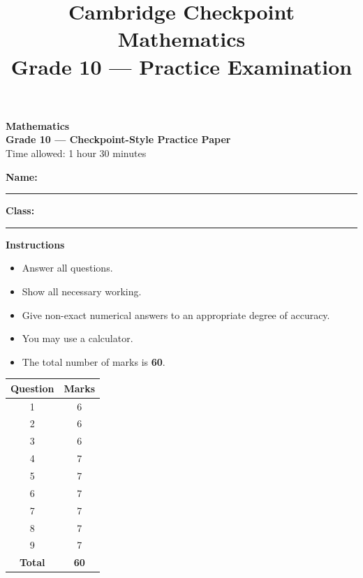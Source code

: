 \makeatletter
{}
\makeatother



\title{Cambridge Checkpoint Mathematics\\
	Grade 10 --- Practice Examination}
\author{}
\date{}


	
	\maketitle
	\vspace{-1.5cm}
	
	\begin{center}
		\textbf{Mathematics}\\[2mm]
		\textbf{Grade 10 --- Checkpoint-Style Practice Paper}\\[2mm]
		Time allowed: 1 hour 30 minutes
	\end{center}
	
	\vspace{5mm}
	
	\noindent
	\textbf{Name:} \rule{8cm}{0.4pt}
	\hfill
	\textbf{Class:} \rule{3cm}{0.4pt}
	
	\vspace{5mm}
	
	\noindent
	\textbf{Instructions}
	\begin{itemize}
		\item Answer all questions.
		\item Show all necessary working.
		\item Give non-exact numerical answers to an appropriate degree of accuracy.
		\item You may use a calculator.
		\item The total number of marks is \textbf{60}.
	\end{itemize}
	
	\vspace{3mm}
	
	\begin{center}
		\begin{tabular}{|c|c|}
			\hline
			\textbf{Question} & \textbf{Marks} \\ \hline
			1 & 6 \\ \hline
			2 & 6 \\ \hline
			3 & 6 \\ \hline
			4 & 7 \\ \hline
			5 & 7 \\ \hline
			6 & 7 \\ \hline
			7 & 7 \\ \hline
			8 & 7 \\ \hline
			9 & 7 \\ \hline
			\textbf{Total} & \textbf{60} \\ \hline
		\end{tabular}
	\end{center}
	
